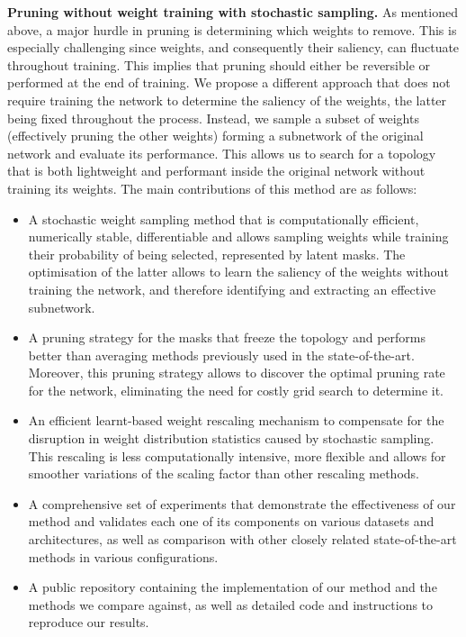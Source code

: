 \noindent \textbf{Pruning without weight training with stochastic sampling.} As
mentioned above, a major hurdle in pruning is determining which weights to
remove. This is especially challenging since weights, and consequently their
saliency, can fluctuate throughout training. This implies that pruning should
either be reversible or performed at the end of training. We propose a different
approach that does not require training the network to determine the saliency of
the weights, the latter being fixed throughout the process. Instead, we sample a
subset of weights (effectively pruning the other weights) forming a subnetwork
of the original network and evaluate its performance. This allows us to search
for a topology that is both lightweight and performant inside the original
network without training its weights. The main contributions of this method are
as follows: \\

\begin{itemize}
      \item A stochastic weight sampling method that is computationally
            efficient, numerically stable, differentiable and allows sampling
            weights while training their probability of being selected,
            represented by latent masks. The optimisation of the latter allows
            to learn the saliency of the weights without training the network,
            and therefore identifying and extracting an effective subnetwork.

      \item A pruning strategy for the masks that freeze the topology and
            performs better than averaging methods previously used in the
            state-of-the-art. Moreover, this pruning strategy allows to discover
            the optimal pruning rate for the network, eliminating the need for
            costly grid search to determine it.

      \item An efficient learnt-based weight rescaling mechanism to compensate
            for the disruption in weight distribution statistics caused by
            stochastic sampling. This rescaling is less computationally
            intensive, more flexible and allows for smoother variations of the
            scaling factor than other rescaling methods.

      \item A comprehensive set of experiments that demonstrate the
            effectiveness of our method and validates each one of its components
            on various datasets and architectures, as well as comparison with
            other closely related state-of-the-art methods in various
            configurations.

      \item A public repository containing the implementation of our method and
            the methods we compare against, as well as detailed code and instructions to
            reproduce our results.\\
\end{itemize}

